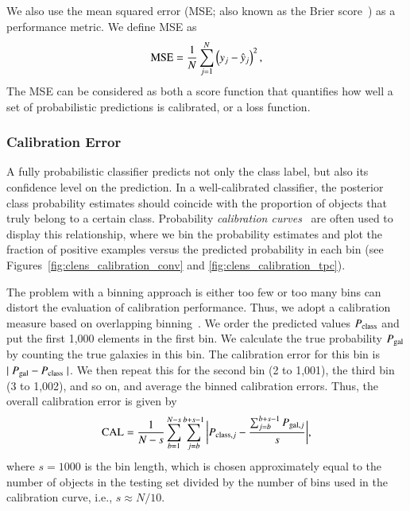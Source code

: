 \documentclass[fleqn,usenatbib]{mnras}
\newcommand{\ie}{{i.e., }}
\begin{document}
We also use the mean squared error
(MSE; also known as the Brier score~\citep{brier1950verification})
as a performance metric. We define MSE as
\begin{equation} \label{eq:mse}
  {\mathrm{MSE}} = \frac{1}{N} \sum^{N}_{j=1}
  \left( y_j - \hat{y}_j \right)^2,
\end{equation}
The MSE can be considered as both a score function that quantifies
how well a set of probabilistic predictions is calibrated,
or a loss function.

\subsubsection{Calibration Error}

A fully probabilistic classifier predicts not only the class label,
but also its confidence level on the prediction.
In a well-calibrated classifier, the posterior class probability estimates
should coincide with the proportion of objects that truly belong to a certain class.
Probability \textit{calibration curves}~\citep[or reliability curves;][]{degroot1983comparison}
are often used to display this relationship,
where we bin the probability estimates and plot the
fraction of positive examples versus the predicted probability in each bin
(see Figures~\ref{fig:clens_calibration_conv} and \ref{fig:clens_calibration_tpc}).

The problem with a binning approach is either too few or too many bins
can distort the evaluation of calibration performance.
Thus, we adopt a calibration measure based on
overlapping binning~\citep{caruana2004data}.
We order the predicted values $P_{\mathrm{class}}$ and
put the first 1,000 elements in the first bin.
We calculate the true probability $P_{\mathrm{gal}}$ by counting the true galaxies
in this bin.
The calibration error for this bin is $\mid P_{\mathrm{gal}} - P_{\mathrm{class}} \mid$.
We then repeat this for the second bin (2 to 1,001),
the third bin (3 to 1,002), and so on, and average the binned calibration errors.
Thus, the overall calibration error is given by
\begin{equation}
  {\mathrm{CAL}} = \frac{1}{N-s} \sum_{b=1}^{N-s} \sum_{j=b}^{b+s-1}
  \bigg| P_{{\mathrm{class}},j} - \frac{\sum_{j=b}^{b+s-1} P_{{\mathrm{gal}},j}}{s} \bigg|,
\end{equation}
where $s=1000$ is the bin length, which is chosen approximately equal to
the number of objects in the testing set divided by the number of bins used in
the calibration curve, \ie $s \approx N / 10$.
\end{document}
